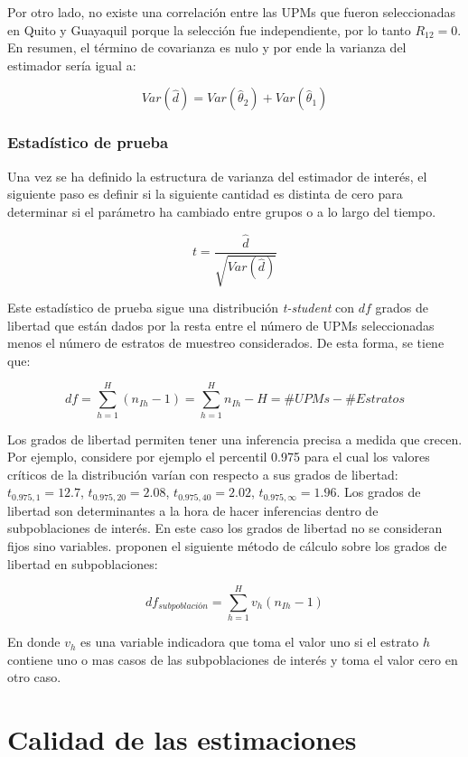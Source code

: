 \documentclass[12pt,spanish,]{book}
\begin{document}
Por otro lado, no existe una correlación entre las UPMs que fueron seleccionadas en Quito y Guayaquil porque la selección fue independiente, por lo tanto \(R_{12} = 0\). En resumen, el término de covarianza es nulo y por ende la varianza del estimador sería igual a:

\[
Var(\hat{d}) 
= Var(\hat{\theta}_2) + Var(\hat{\theta}_1)
\]

\hypertarget{estadistico-de-prueba}{%
\subsection{Estadístico de prueba}\label{estadistico-de-prueba}}

Una vez se ha definido la estructura de varianza del estimador de interés, el siguiente paso es definir si la siguiente cantidad es distinta de cero para determinar si el parámetro ha cambiado entre grupos o a lo largo del tiempo.

\[
t = \frac{\hat{d}}{\sqrt{Var(\hat{d})}}
\]

Este estadístico de prueba sigue una distribución \emph{t-student} con \(df\) grados de libertad que están dados por la resta entre el número de UPMs seleccionadas menos el número de estratos de muestreo considerados. De esta forma, se tiene que:

\[
df = \sum_{h=1}^H (n_{Ih} - 1) = \sum_{h=1}^H n_{Ih} - H = \#UPMs - \#Estratos
\]

Los grados de libertad permiten tener una inferencia precisa a medida que crecen. Por ejemplo, considere por ejemplo el percentil 0.975 para el cual los valores críticos de la distribución varían con respecto a sus grados de libertad: \(t_{0.975, 1}=12.7\), \(t_{0.975, 20}=2.08\), \(t_{0.975, 40}=2.02\), \(t_{0.975, \infty}=1.96\). Los grados de libertad son determinantes a la hora de hacer inferencias dentro de subpoblaciones de interés. En este caso los grados de libertad no se consideran fijos sino variables. \textcite{Korn_Graubard_1999} proponen el siguiente método de cálculo sobre los grados de libertad en subpoblaciones:

\[
df_{subpoblación} = \sum_{h=1}^H v_h(n_{Ih} - 1)
\]

En donde \(v_h\) es una variable indicadora que toma el valor uno si el estrato \(h\) contiene uno o mas casos de las subpoblaciones de interés y toma el valor cero en otro caso.

\hypertarget{calidad-de-las-estimaciones}{%
\chapter{Calidad de las estimaciones}\label{calidad-de-las-estimaciones}}
\end{document}
